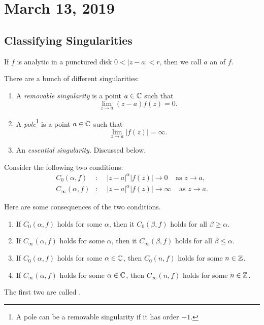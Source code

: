 \section{March 13, 2019}

\subsection{Classifying Singularities}

\begin{definition}
    If $f$ is analytic in a punctured disk $0 < |z-a| < r$,
    then we call $a$ an  of $f$.
\end{definition}

There are a bunch of different singularities:
\begin{enumerate}
    \item A \textit{removable singularity} is a point $a \in \operatorname{\mathbb{C}}$
        such that 
        \[ \lim_{z \to a } (z-a)f(z) = 0. \]
    \item A \textit{pole}\footnote{A pole
        can be a removable singularity if it has order $-1$.} is a point $a \in \operatorname{\mathbb{C}}$ such that
        \[\lim_{z \to a} |f(z)| = \infty. \]
    \item An \textit{essential singularity}.  Discussed below.
\end{enumerate}

Consider the following two conditions:
\begin{align*}
    C_0(\alpha, f)&: \;\;\;\; |z-a|^{\alpha} |f(z)| \to 0 \;\;\;\; 
    \text{as $z \to a$,} \\
    C_{\infty}(\alpha, f)&: \;\;\;\; |z-a|^{\alpha} |f(z)| \to \infty 
    \;\;\;\; \text{as $z \to a$.}
\end{align*}

Here are some consequences of the two conditions.
\begin{enumerate}
    \item If $C_0(\alpha, f)$ holds for some $\alpha$, then it
        $C_0(\beta, f)$ holds for all $\beta \ge \alpha$.
    \item If $C_{\infty}(\alpha, f)$ holds for some $\alpha$, then it
        $C_{\infty}(\beta, f)$ holds for all $\beta \le \alpha$.
    \item If $C_0(\alpha, f)$ holds for some $\alpha \in \operatorname{\mathbb{C}}$,
        then $C_0(n, f)$ holds for some $n \in \operatorname{\mathbb{Z}}$.
    \item If $C_{\infty}(\alpha, f)$ holds for some $\alpha \in \operatorname{\mathbb{C}}$,
        then $C_{\infty}(n, f)$ holds for some $n \in \operatorname{\mathbb{Z}}$.
\end{enumerate}
The first two are called .

